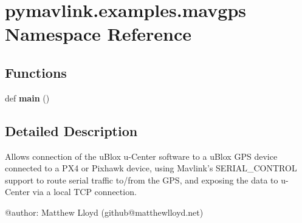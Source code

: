 \hypertarget{namespacepymavlink_1_1examples_1_1mavgps}{}\section{pymavlink.\+examples.\+mavgps Namespace Reference}
\label{namespacepymavlink_1_1examples_1_1mavgps}
\subsection*{Functions}
\begin{DoxyCompactItemize}
\item 
\mbox{\label{namespacepymavlink_1_1examples_1_1mavgps_a344a6c39657f3fd2f8a6053272a313a0}} 
def {\bfseries main} ()
\end{DoxyCompactItemize}


\subsection{Detailed Description}
\begin{DoxyVerb}Allows connection of the uBlox u-Center software to
a uBlox GPS device connected to a PX4 or Pixhawk device,
using Mavlink's SERIAL_CONTROL support to route serial
traffic to/from the GPS, and exposing the data to u-Center
via a local TCP connection.

@author: Matthew Lloyd (github@matthewlloyd.net)
\end{DoxyVerb}
 